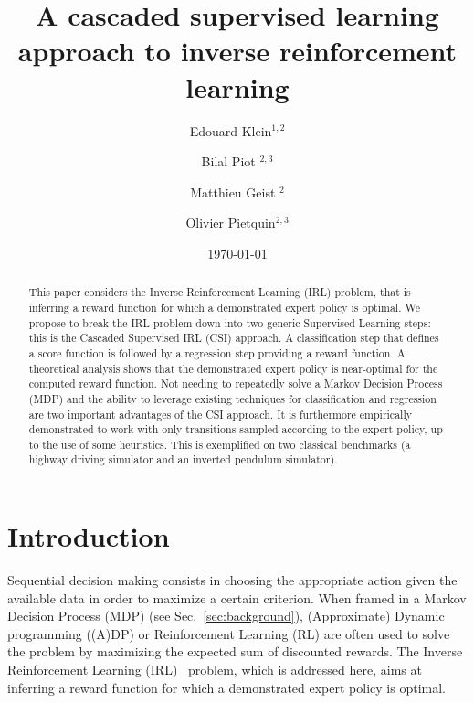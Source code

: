 \documentclass[smallextended]{svjour3}
\begin{document}
\title{A cascaded supervised learning approach to inverse reinforcement learning}
\author{Edouard Klein$^{1,2}$ \and Bilal Piot $^{2,3}$\and Matthieu Geist $^{2}$\and Olivier Pietquin$^{2,3}$}
\date{\today}


\maketitle

\begin{abstract}
  This paper considers the Inverse Reinforcement Learning (IRL) problem, that is inferring a reward function for which a demonstrated expert policy is optimal.
We propose to break the IRL problem down into two generic Supervised Learning steps: this is the Cascaded Supervised IRL (CSI) approach. A classification step that defines a score function is followed by a regression step providing a reward function.
A theoretical analysis shows that the demonstrated expert policy is near-optimal for the computed reward function.
Not needing to repeatedly solve a Markov Decision Process (MDP) and the ability to leverage existing techniques for classification and regression are two important advantages of the CSI approach. It is furthermore empirically demonstrated to work with only transitions sampled according to the expert policy, up to the use of some heuristics. This is exemplified on two classical benchmarks (a highway driving simulator and an inverted pendulum simulator).
  \end{abstract}
\section{Introduction}
\label{sec-2}
Sequential decision making consists in choosing the appropriate action given the available data in order to maximize a certain criterion. When framed in a Markov Decision Process (MDP) (see Sec.~\ref{sec:background}), (Approximate) Dynamic programming ((A)DP) or Reinforcement Learning (RL) are often used to solve the problem by maximizing the expected sum of discounted rewards. The Inverse Reinforcement Learning (IRL)~\cite{russell1998learning} problem, which is addressed here, aims at inferring a reward function for which a demonstrated expert policy is optimal.
\end{document}
